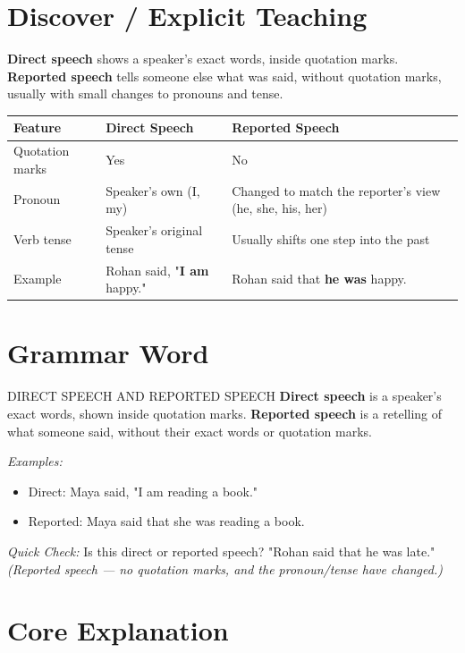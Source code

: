 \section{Discover / Explicit Teaching}
\textbf{Direct speech} shows a speaker's exact words, inside quotation marks.
\textbf{Reported speech} tells someone else what was said, without quotation marks, usually with small changes to pronouns and tense.

\begin{table}[h!]
\centering
\begin{tabular}{|l|l|l|}
\hline
\textbf{Feature} & \textbf{Direct Speech} & \textbf{Reported Speech} \\
\hline
Quotation marks & Yes & No \\
Pronoun & Speaker's own (I, my) & Changed to match the reporter's view (he, she, his, her) \\
Verb tense & Speaker's original tense & Usually shifts one step into the past \\
Example & Rohan said, "\textbf{I am} happy." & Rohan said that \textbf{he was} happy. \\
\hline
\end{tabular}
\end{table}

\section{Grammar Word}
\begin{grammarword}{DIRECT SPEECH AND REPORTED SPEECH}
\textbf{Direct speech} is a speaker's exact words, shown inside quotation marks.
\textbf{Reported speech} is a retelling of what someone said, without their exact words or quotation marks.

\textit{Examples:}
\begin{itemize}
    \item Direct: Maya said, "I am reading a book."
    \item Reported: Maya said that she was reading a book.
\end{itemize}

\textit{Quick Check:} Is this direct or reported speech? "Rohan said that he was late." \textit{(Reported speech — no quotation marks, and the pronoun/tense have changed.)}
\end{grammarword}

\section{Core Explanation}

